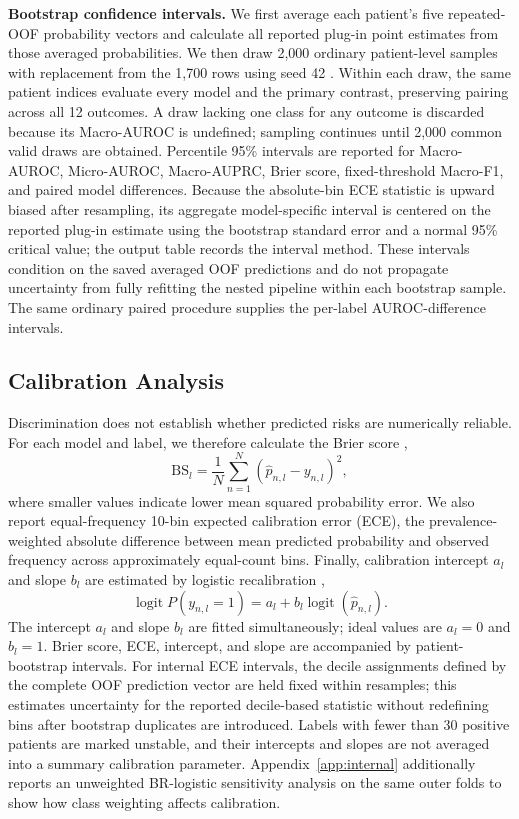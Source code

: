 \documentclass{ieeeaccess}
\begin{document}
\textbf{Bootstrap confidence intervals.} We first average each patient's five repeated-OOF probability vectors and calculate all reported plug-in point estimates from those averaged probabilities. We then draw 2,000 ordinary patient-level samples with replacement from the 1,700 rows using seed 42 \cite{efron1994}. Within each draw, the same patient indices evaluate every model and the primary contrast, preserving pairing across all 12 outcomes. A draw lacking one class for any outcome is discarded because its Macro-AUROC is undefined; sampling continues until 2,000 common valid draws are obtained. Percentile 95\% intervals are reported for Macro-AUROC, Micro-AUROC, Macro-AUPRC, Brier score, fixed-threshold Macro-F1, and paired model differences. Because the absolute-bin ECE statistic is upward biased after resampling, its aggregate model-specific interval is centered on the reported plug-in estimate using the bootstrap standard error and a normal 95\% critical value; the output table records the interval method. These intervals condition on the saved averaged OOF predictions and do not propagate uncertainty from fully refitting the nested pipeline within each bootstrap sample. The same ordinary paired procedure supplies the per-label AUROC-difference intervals.

\subsection{Calibration Analysis}

Discrimination does not establish whether predicted risks are numerically reliable. For each model and label, we therefore calculate the Brier score \cite{brier1950},
\begin{equation}
\mathrm{BS}_l=\frac{1}{N}\sum_{n=1}^{N}(\hat p_{n,l}-y_{n,l})^2,
\end{equation}
where smaller values indicate lower mean squared probability error. We also report equal-frequency 10-bin expected calibration error (ECE), the prevalence-weighted absolute difference between mean predicted probability and observed frequency across approximately equal-count bins. Finally, calibration intercept $a_l$ and slope $b_l$ are estimated by logistic recalibration \cite{vancalster2019},
\begin{equation}
\operatorname{logit}P(y_{n,l}=1)=a_l+b_l\operatorname{logit}(\hat p_{n,l}).
\end{equation}
The intercept $a_l$ and slope $b_l$ are fitted simultaneously; ideal values are $a_l=0$ and $b_l=1$. Brier score, ECE, intercept, and slope are accompanied by patient-bootstrap intervals. For internal ECE intervals, the decile assignments defined by the complete OOF prediction vector are held fixed within resamples; this estimates uncertainty for the reported decile-based statistic without redefining bins after bootstrap duplicates are introduced. Labels with fewer than 30 positive patients are marked unstable, and their intercepts and slopes are not averaged into a summary calibration parameter. Appendix~\ref{app:internal} additionally reports an unweighted BR-logistic sensitivity analysis on the same outer folds to show how class weighting affects calibration.
\end{document}
